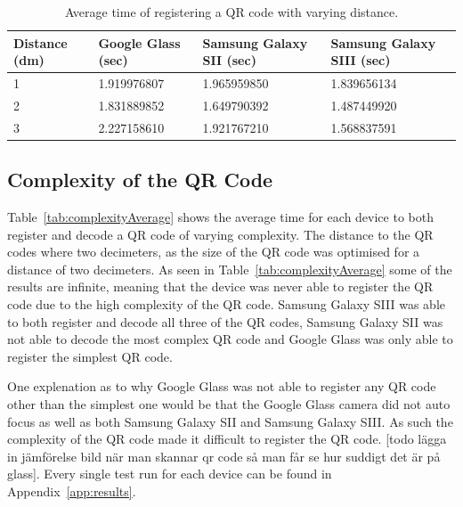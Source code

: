 	\begin{table}[H]%
    		\caption{Average time of registering a QR code with varying distance.} \label{tab:distanceAverage}
		\centering \begin{tabularx}{\textwidth}{l|X|X|X} \hline
		\textbf{Distance (dm)} & \textbf{Google Glass (sec)} & \textbf{Samsung Galaxy SII (sec)} & \textbf{Samsung Galaxy SIII (sec)} \\ \hline \hline
       
		1	&1.919976807	&1.965959850	&1.839656134	\\ \hline
		2	&1.831889852	&1.649790392	&1.487449920	\\ \hline
		3	&2.227158610	&1.921767210	&1.568837591	\\ \hline
		
		\end{tabularx}
	\end{table}

\subsection{Complexity of the QR Code}

Table~\ref{tab:complexityAverage} shows the average time for each device to both register and decode a QR code of varying complexity. The distance to the QR codes where two decimeters, as the size of the QR code was optimised for a distance of two decimeters. As seen in Table~\ref{tab:complexityAverage} some of the results are infinite, meaning that the device was never able to register the QR code due to the high complexity of the QR code. Samsung Galaxy SIII was able to both register and decode all three of the QR codes, Samsung Galaxy SII was not able to decode the most complex QR code and Google Glass was only able to register the simplest QR code.

One explenation as to why Google Glass was not able to register any QR code other than the simplest one would be that the Google Glass camera did not auto focus as well as both Samsung Galaxy SII and Samsung Galaxy SIII. As such the complexity of the QR code made it difficult to register the QR code. [todo lägga in jämförelse bild när man skannar qr code så man får se hur suddigt det är på glass]. Every single test run for each device can be found in Appendix~\ref{app:results}.

